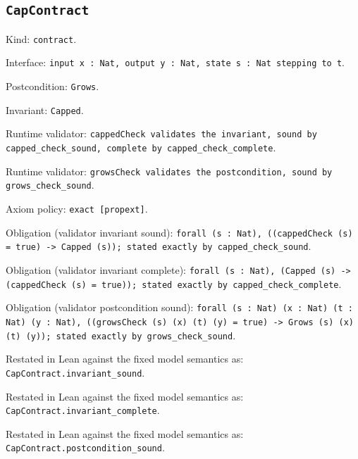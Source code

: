 \documentclass[11pt]{article}
\begin{document}
\subsection*{\texttt{CapContract}}
\noindent Kind: \texttt{contract}.\par
\noindent Interface: \texttt{input x : Nat, output y : Nat, state s : Nat stepping to t}.\par
\noindent Postcondition: \texttt{Grows}.\par
\noindent Invariant: \texttt{Capped}.\par
\noindent Runtime validator: \texttt{cappedCheck validates the invariant, sound by capped\_check\_sound, complete by capped\_check\_complete}.\par
\noindent Runtime validator: \texttt{growsCheck validates the postcondition, sound by grows\_check\_sound}.\par
\noindent Axiom policy: \texttt{exact [propext]}.\par
\noindent Obligation (validator invariant sound): \texttt{forall (s : Nat), ((cappedCheck (s) = true) -> Capped (s)); stated exactly by capped\_check\_sound}.\par
\noindent Obligation (validator invariant complete): \texttt{forall (s : Nat), (Capped (s) -> (cappedCheck (s) = true)); stated exactly by capped\_check\_complete}.\par
\noindent Obligation (validator postcondition sound): \texttt{forall (s : Nat) (x : Nat) (t : Nat) (y : Nat), ((growsCheck (s) (x) (t) (y) = true) -> Grows (s) (x) (t) (y)); stated exactly by grows\_check\_sound}.\par
\noindent Restated in Lean against the fixed model semantics as: \texttt{CapContract.invariant\_sound}.\par
\noindent Restated in Lean against the fixed model semantics as: \texttt{CapContract.invariant\_complete}.\par
\noindent Restated in Lean against the fixed model semantics as: \texttt{CapContract.postcondition\_sound}.\par
\end{document}
